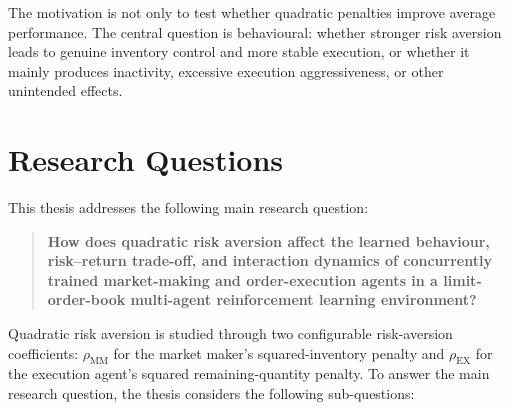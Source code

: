 \documentclass[oneside]{uva-inf-bachelor-thesis}
\begin{document}
The motivation is not only to test whether quadratic penalties improve average performance. The central question is behavioural: whether stronger risk aversion leads to genuine inventory control and more stable execution, or whether it mainly produces inactivity, excessive execution aggressiveness, or other unintended effects.


\section{Research Questions}

This thesis addresses the following main research question:

\begin{quote}
\textbf{How does quadratic risk aversion affect the learned behaviour, risk--return trade-off, and interaction dynamics of concurrently trained market-making and order-execution agents in a limit-order-book multi-agent reinforcement learning environment?}
\end{quote}

Quadratic risk aversion is studied through two configurable risk-aversion coefficients: $\rho_{\mathrm{MM}}$ for the market maker's squared-inventory penalty and $\rho_{\mathrm{EX}}$ for the execution agent's squared remaining-quantity penalty. To answer the main research question, the thesis considers the following sub-questions:
\end{document}
